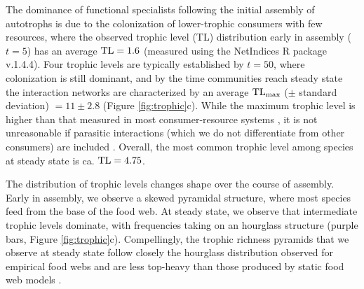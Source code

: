 \documentclass[twocolumn,preprintnumbers,amsmath,amssymb,superscriptaddress,linenumbers]{revtex4-1}
\begin{document}
The dominance of functional specialists following the initial assembly of autotrophs is due to the colonization of lower-trophic consumers with few resources, where the observed trophic level (TL) distribution early in assembly ($t=5$) has an average ${\rm TL}=1.6$ (measured using the NetIndices R package v.1.4.4\cite{Kones2009}).
Four trophic levels are typically established by $t=50$, where colonization is still dominant, and by the time communities reach steady state the interaction networks are characterized by an average ${\rm TL_{max}}$ ($\pm$ standard deviation) $=11 \pm 2.8$ (Figure \ref{fig:trophic}c).
While the maximum trophic level is higher than that measured in most consumer-resource systems \cite{Williams2002}, it is not unreasonable if parasitic interactions (which we do not differentiate from other consumers) are included \cite{Lafferty2006}.
Overall, the most common trophic level among species at steady state is ca. ${\rm TL}=4.75$. %

The distribution of trophic levels changes shape over the course of assembly.
Early in assembly, we observe a skewed pyramidal structure, where most species feed from the base of the food web.
At steady state, we observe that intermediate trophic levels dominate, with frequencies taking on an hourglass structure (purple bars, Figure \ref{fig:trophic}c).
Compellingly, the trophic richness pyramids that we observe at steady state follow closely the hourglass distribution observed for empirical food webs and are less top-heavy than those produced by static food web models \cite{Turney2016}.\\
\end{document}
